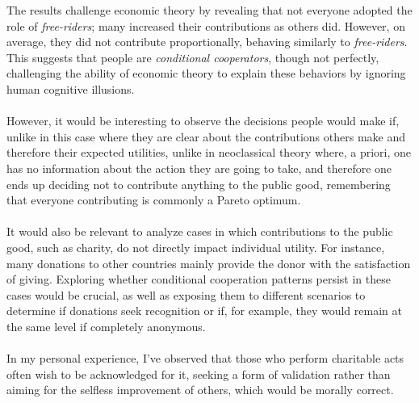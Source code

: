 \documentclass[11pt]{article}
\begin{document}
\begin{flushleft}
    The results challenge economic theory by revealing that not everyone adopted the role of \textit{free-riders}; many increased their contributions as others did. However, on average, they did not contribute proportionally, behaving similarly to \textit{free-riders}. This suggests that people are \textit{conditional cooperators}, though not perfectly, challenging the ability of economic theory to explain these behaviors by ignoring human cognitive illusions.\\~\\

    However, it would be interesting to observe the decisions people would make if, unlike in this case where they are clear about the contributions others make and therefore their expected utilities, unlike in neoclassical theory where, a priori, one has no information about the action they are going to take, and therefore one ends up deciding not to contribute anything to the public good, remembering that everyone contributing is commonly a Pareto optimum.\\~\\

    It would also be relevant to analyze cases in which contributions to the public good, such as charity, do not directly impact individual utility. For instance, many donations to other countries mainly provide the donor with the satisfaction of giving. Exploring whether conditional cooperation patterns persist in these cases would be crucial, as well as exposing them to different scenarios to determine if donations seek recognition or if, for example, they would remain at the same level if completely anonymous.\\~\\

    In my personal experience, I've observed that those who perform charitable acts often wish to be acknowledged for it, seeking a form of validation rather than aiming for the selfless improvement of others, which would be morally correct.
\end{flushleft}

\newpage
\medskip

\newpage
\nocite{*}

\end{document}
